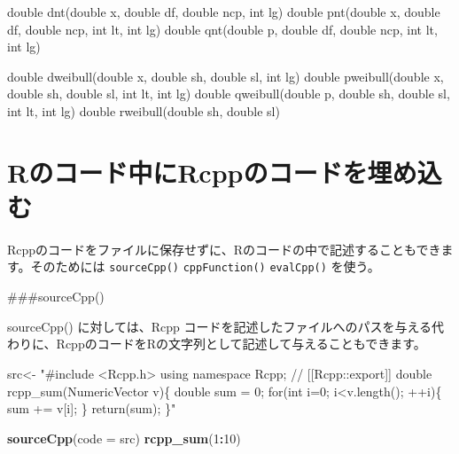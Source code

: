 \documentclass[]{book}
\newenvironment{Shaded}{\begin{snugshade}}{\end{snugshade}}
\newcommand{\DataTypeTok}[1]{\textcolor[rgb]{0.13,0.29,0.53}{#1}}
\newcommand{\DecValTok}[1]{\textcolor[rgb]{0.00,0.00,0.81}{#1}}
\newcommand{\KeywordTok}[1]{\textcolor[rgb]{0.13,0.29,0.53}{\textbf{#1}}}
\newcommand{\NormalTok}[1]{#1}
\newcommand{\OperatorTok}[1]{\textcolor[rgb]{0.81,0.36,0.00}{\textbf{#1}}}
\newcommand{\StringTok}[1]{\textcolor[rgb]{0.31,0.60,0.02}{#1}}
\begin{document}
\begin{Shaded}
\begin{Highlighting}[]
\DataTypeTok{double}\NormalTok{ dnt(}\DataTypeTok{double}\NormalTok{ x, }\DataTypeTok{double}\NormalTok{ df, }\DataTypeTok{double}\NormalTok{ ncp, }\DataTypeTok{int}\NormalTok{ lg)     }
\DataTypeTok{double}\NormalTok{ pnt(}\DataTypeTok{double}\NormalTok{ x, }\DataTypeTok{double}\NormalTok{ df, }\DataTypeTok{double}\NormalTok{ ncp, }\DataTypeTok{int}\NormalTok{ lt, }\DataTypeTok{int}\NormalTok{ lg) }
\DataTypeTok{double}\NormalTok{ qnt(}\DataTypeTok{double}\NormalTok{ p, }\DataTypeTok{double}\NormalTok{ df, }\DataTypeTok{double}\NormalTok{ ncp, }\DataTypeTok{int}\NormalTok{ lt, }\DataTypeTok{int}\NormalTok{ lg) }

\DataTypeTok{double}\NormalTok{ dweibull(}\DataTypeTok{double}\NormalTok{ x, }\DataTypeTok{double}\NormalTok{ sh, }\DataTypeTok{double}\NormalTok{ sl, }\DataTypeTok{int}\NormalTok{ lg)     }
\DataTypeTok{double}\NormalTok{ pweibull(}\DataTypeTok{double}\NormalTok{ x, }\DataTypeTok{double}\NormalTok{ sh, }\DataTypeTok{double}\NormalTok{ sl, }\DataTypeTok{int}\NormalTok{ lt, }\DataTypeTok{int}\NormalTok{ lg) }
\DataTypeTok{double}\NormalTok{ qweibull(}\DataTypeTok{double}\NormalTok{ p, }\DataTypeTok{double}\NormalTok{ sh, }\DataTypeTok{double}\NormalTok{ sl, }\DataTypeTok{int}\NormalTok{ lt, }\DataTypeTok{int}\NormalTok{ lg) }
\DataTypeTok{double}\NormalTok{ rweibull(}\DataTypeTok{double}\NormalTok{ sh, }\DataTypeTok{double}\NormalTok{ sl)}
\end{Highlighting}
\end{Shaded}

\hypertarget{rrcpp}{%
\chapter{Rのコード中にRcppのコードを埋め込む}\label{rrcpp}}

Rcppのコードをファイルに保存せずに、Rのコードの中で記述することもできます。そのためには \texttt{sourceCpp()} \texttt{cppFunction()} \texttt{evalCpp()} を使う。

\#\#\#sourceCpp()

sourceCpp() に対しては、Rcpp コードを記述したファイルへのパスを与える代わりに、RcppのコードをRの文字列として記述して与えることもできます。

\begin{Shaded}
\begin{Highlighting}[]
\NormalTok{src<-}
\StringTok{"#include <Rcpp.h>}
\StringTok{using namespace Rcpp;}
\StringTok{// [[Rcpp::export]]}
\StringTok{double rcpp_sum(NumericVector v)\{}
\StringTok{  double sum = 0;}
\StringTok{  for(int i=0; i<v.length(); ++i)\{}
\StringTok{    sum += v[i];}
\StringTok{  \}}
\StringTok{  return(sum);}
\StringTok{\}"}

\KeywordTok{sourceCpp}\NormalTok{(}\DataTypeTok{code =}\NormalTok{ src)}
\KeywordTok{rcpp_sum}\NormalTok{(}\DecValTok{1}\OperatorTok{:}\DecValTok{10}\NormalTok{)}
\end{Highlighting}
\end{Shaded}
\end{document}
